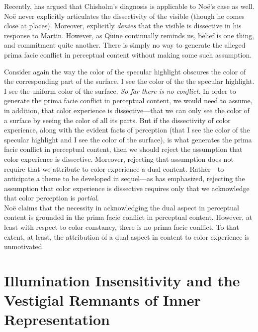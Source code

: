 \documentclass[12pt]{article}
\begin{document}
Recently, \citet{Martin:2008kl} has argued that Chisholm's diagnosis is applicable to Noë's case as well. Noë never explicitly articulates the dissectivity of the visible (though he comes close at places). Moreover, \citet[698-699]{Noe:2008oq} explicitly \emph{denies} that the visible is dissective in his response to Martin. However, as Quine continually reminds us, belief is one thing, and commitment quite another. There is simply no way to generate the alleged prima facie conflict in perceptual content without making some such assumption.


Consider again the way the color of the specular highlight obscures the color of the corresponding part of the surface. I see the color of the the specular highlight. I see the uniform color of the surface. \emph{So far there is no conflict.} In order to generate the prima facie conflict in perceptual content, we would need to assume, in addition, that color experience is dissective---that we can only see the color of a surface by seeing the color of all its parts. But if the dissectivity of color experience, along with the evident facts of perception (that I see the color of the specular highlight and I see the color of the surface), is what generates the prima facie conflict in perceptual content, then we should reject the assumption that color experience is dissective. Moreover, rejecting that assumption does not require that we attribute to color experience a dual content. Rather---to anticipate a theme to be developed in sequel---as \citet{Hilbert:1987jq} has emphasized, rejecting the assumption that color experience is dissective requires only that we acknowledge that color perception is \emph{partial}.\\


\noindent Noë claims that the necessity in acknowledging the dual aspect in perceptual content is grounded in the prima facie conflict in perceptual content. However, at least with respect to color constancy, there is no prima facie conflict. To that extent, at least, the attribution of a dual aspect in content to color experience is unmotivated.


\section{Illumination Insensitivity and the Vestigial Remnants of Inner Representation} %
\label{sec:vestigal_remnants_of_inner_representations}
\end{document}
